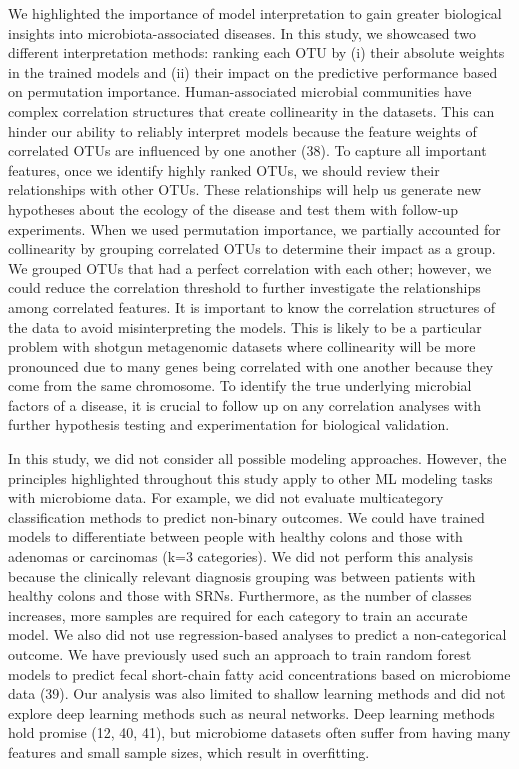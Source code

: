 \documentclass[11pt,]{article}
\begin{document}
We highlighted the importance of model interpretation to gain greater
biological insights into microbiota-associated diseases. In this study,
we showcased two different interpretation methods: ranking each OTU by
(i) their absolute weights in the trained models and (ii) their impact
on the predictive performance based on permutation importance.
Human-associated microbial communities have complex correlation
structures that create collinearity in the datasets. This can hinder our
ability to reliably interpret models because the feature weights of
correlated OTUs are influenced by one another (38). To capture all
important features, once we identify highly ranked OTUs, we should
review their relationships with other OTUs. These relationships will
help us generate new hypotheses about the ecology of the disease and
test them with follow-up experiments. When we used permutation
importance, we partially accounted for collinearity by grouping
correlated OTUs to determine their impact as a group. We grouped OTUs
that had a perfect correlation with each other; however, we could reduce
the correlation threshold to further investigate the relationships among
correlated features. It is important to know the correlation structures
of the data to avoid misinterpreting the models. This is likely to be a
particular problem with shotgun metagenomic datasets where collinearity
will be more pronounced due to many genes being correlated with one
another because they come from the same chromosome. To identify the true
underlying microbial factors of a disease, it is crucial to follow up on
any correlation analyses with further hypothesis testing and
experimentation for biological validation.

In this study, we did not consider all possible modeling approaches.
However, the principles highlighted throughout this study apply to other
ML modeling tasks with microbiome data. For example, we did not evaluate
multicategory classification methods to predict non-binary outcomes. We
could have trained models to differentiate between people with healthy
colons and those with adenomas or carcinomas (k=3 categories). We did
not perform this analysis because the clinically relevant diagnosis
grouping was between patients with healthy colons and those with SRNs.
Furthermore, as the number of classes increases, more samples are
required for each category to train an accurate model. We also did not
use regression-based analyses to predict a non-categorical outcome. We
have previously used such an approach to train random forest models to
predict fecal short-chain fatty acid concentrations based on microbiome
data (39). Our analysis was also limited to shallow learning methods and
did not explore deep learning methods such as neural networks. Deep
learning methods hold promise (12, 40, 41), but microbiome datasets
often suffer from having many features and small sample sizes, which
result in overfitting.
\end{document}
